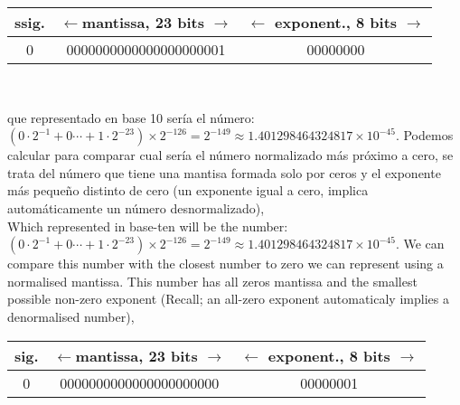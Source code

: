 \begin{minipage}{\textwidth}
\centering
\begin{tabular}{|c||c||c|}
\hline
ssig.&$\leftarrow$mantissa, 23 bits $\rightarrow$&$\leftarrow$ exponent., 8 bits $\rightarrow$\\
\hline
0&0000000000000000000001&00000000\\
\hline
\end{tabular}\\
\end{minipage}

\begin{paracol}{2}
que representado en base 10 sería el número: $(0\cdot2^{-1}+0\cdots+1\cdot2^{-23})\times 2^{-126}=2^{-149}\approx 1.401298464324817\times10^{-45}$. Podemos calcular para comparar cual sería el número normalizado más próximo a cero, se trata del número que tiene una mantisa formada solo por ceros y el exponente más pequeño distinto de cero (un exponente igual a cero, implica automáticamente un número desnormalizado),\\ 
\switchcolumn
Which represented in base-ten will be the number: $(0\cdot2^{-1}+0\cdots+1\cdot2^{-23})\times 2^{-126}=2^{-149}\approx 1.401298464324817\times10^{-45}$.
We can compare this number with the closest number to zero we can represent using a normalised mantissa. This number has all zeros mantissa and the smallest possible non-zero exponent (Recall; an all-zero exponent automaticaly implies a denormalised number),    
\end{paracol}

\begin{minipage}{\textwidth}
	\centering
\begin{tabular}{|c||c||c|}
\hline
sig.&$\leftarrow$mantissa, 23 bits $\rightarrow$&$\leftarrow$ exponent., 8 bits $\rightarrow$\\
\hline
0&0000000000000000000000&00000001\\
\hline
\end{tabular}\\
\end{minipage}

